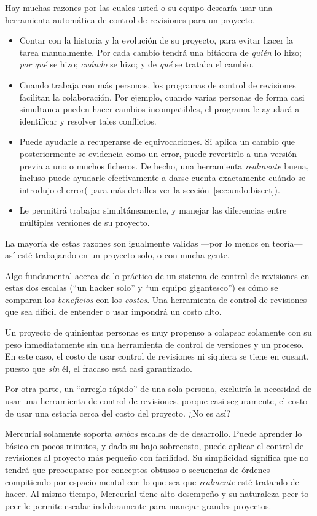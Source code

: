 Hay muchas razones por las cuales usted o su equipo desearía usar una
herramienta automática de control de revisiones para un proyecto.
\begin{itemize}
\item Contar con la historia y la evolución de su proyecto, para
  evitar hacer la tarea manualmente. Por cada cambio tendrá una
  bitácora de \emph{quién} lo hizo; \emph{por qué} se hizo;
  \emph{cuándo} se hizo; y de \emph{qué} se trataba el cambio.
\item Cuando trabaja con más personas, los programas de control de
  revisiones facilitan la colaboración.  Por ejemplo, cuando varias
  personas de forma casi simultanea pueden hacer cambios
  incompatibles, el programa le ayudará a identificar y resolver tales
  conflictos.
\item Puede ayudarle a recuperarse de equivocaciones. Si aplica un
  cambio que posteriormente se evidencia como un error, puede
  revertirlo a una versión previa a uno o muchos ficheros. De hecho,
  una herramienta \emph{realmente} buena, incluso puede ayudarle
  efectivamente a darse cuenta exactamente cuándo se introdujo el
  error( para más detalles ver la sección~\ref{sec:undo:bisect}).
\item Le permitirá trabajar simultáneamente, y manejar las diferencias
  entre múltiples versiones de su proyecto.
\end{itemize}
La mayoría de estas razones son igualmente validas ---por lo menos en
teoría--- así esté trabajando en un proyecto solo, o con mucha gente.

Algo fundamental acerca de lo práctico de un sistema de control de
revisiones en estas dos escalas (``un hacker solo'' y ``un equipo
gigantesco'') es cómo se comparan los \emph{beneficios} con los
\emph{costos}.  Una herramienta de control de revisiones que sea
difícil de entender o usar impondrá un costo alto.

Un proyecto de quinientas personas es muy propenso a colapsar
solamente con su peso inmediatamente sin una herramienta de control de
versiones y un proceso. En este caso, el costo de usar control de
revisiones ni siquiera se tiene en cueant, puesto que \emph{sin} él,
el fracaso está casi garantizado.

Por otra parte, un ``arreglo rápido'' de una sola persona, excluiría
la necesidad de usar una herramienta de control de revisiones, porque
casi seguramente, el costo de usar una estaría cerca del costo del
proyecto. ¿No es así?

Mercurial solamente soporta \emph{ambas} escalas de de
desarrollo. Puede aprender lo básico en pocos minutos, y dado su bajo
sobrecosto, puede aplicar el control de revisiones al proyecto más
pequeño con facilidad. Su simplicidad significa que no tendrá que
preocuparse por conceptos obtusos o secuencias de órdenes compitiendo
por espacio mental con lo que sea que \emph{realmente} esté tratando
de hacer.  Al mismo tiempo, Mercurial tiene alto desempeño y su
naturaleza peer-to-peer le permite escalar indoloramente para manejar
grandes proyectos.

